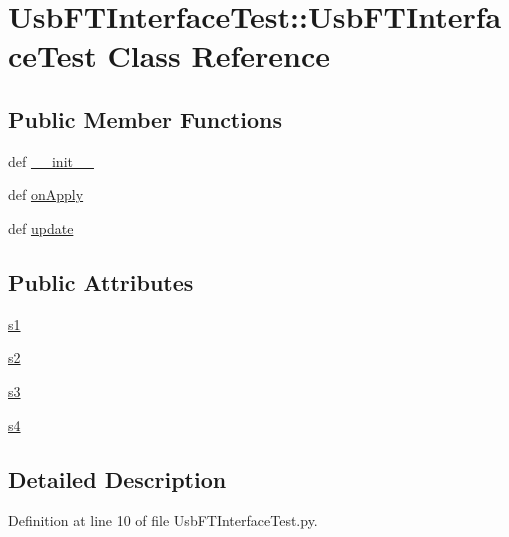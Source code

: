 \hypertarget{classUsbFTInterfaceTest_1_1UsbFTInterfaceTest}{
\section{UsbFTInterfaceTest::UsbFTInterfaceTest Class Reference}
\label{classUsbFTInterfaceTest_1_1UsbFTInterfaceTest}
}
\subsection*{Public Member Functions}
\begin{DoxyCompactItemize}
\item 
def \hyperlink{classUsbFTInterfaceTest_1_1UsbFTInterfaceTest_ad11b06306755615ca3c5f772e5d0f424}{\_\-\_\-init\_\-\_\-}
\item 
def \hyperlink{classUsbFTInterfaceTest_1_1UsbFTInterfaceTest_a1c0d9fa0a23a621bd47e42509822980b}{onApply}
\item 
def \hyperlink{classUsbFTInterfaceTest_1_1UsbFTInterfaceTest_a7552f5470ad7457b47e4a71d82852721}{update}
\end{DoxyCompactItemize}
\subsection*{Public Attributes}
\begin{DoxyCompactItemize}
\item 
\hyperlink{classUsbFTInterfaceTest_1_1UsbFTInterfaceTest_ac4b7f2371d7d8e4385d432f77374005f}{s1}
\item 
\hyperlink{classUsbFTInterfaceTest_1_1UsbFTInterfaceTest_a34e71f256da6e35997a45f6b4b0e323c}{s2}
\item 
\hyperlink{classUsbFTInterfaceTest_1_1UsbFTInterfaceTest_af3910479f8d5c10f72d5db3aaa344c4f}{s3}
\item 
\hyperlink{classUsbFTInterfaceTest_1_1UsbFTInterfaceTest_a06521aa6f0d8367a987bfb04d4605666}{s4}
\end{DoxyCompactItemize}


\subsection{Detailed Description}


Definition at line 10 of file UsbFTInterfaceTest.py.

